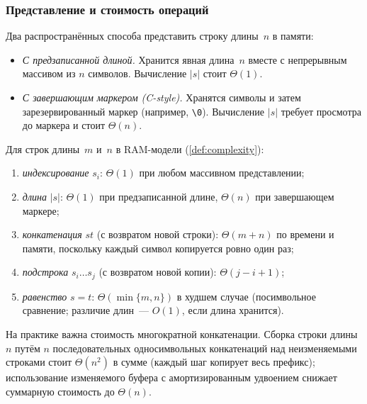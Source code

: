 \subsubsection*{Представление и стоимость операций}

Два распространённых способа представить строку длины~$n$ в памяти:
\begin{itemize}
  \item \emph{С предзаписанной длиной.} Хранится явная длина~$n$ вместе
        с непрерывным массивом из $n$ символов. Вычисление $|s|$
        стоит $\Theta(1)$.
  \item \emph{С завершающим маркером (C-style).} Хранятся символы и
        затем зарезервированный маркер (например,
        \texttt{\textbackslash 0}). Вычисление $|s|$ требует
        просмотра до маркера и стоит $\Theta(n)$.
\end{itemize}

\begin{proposition}
\label{prop:string-ops-cost}
Для строк длины~$m$ и~$n$ в RAM-модели (\cref{def:complexity}):
\begin{enumerate}[label=(\alph*)]
  \item \emph{индексирование} $s_i$: $\Theta(1)$ при любом массивном
        представлении;
  \item \emph{длина} $|s|$: $\Theta(1)$ при предзаписанной длине,
        $\Theta(n)$ при завершающем маркере;
  \item \emph{конкатенация} $s t$ (с возвратом новой строки):
        $\Theta(m + n)$ по времени и памяти, поскольку каждый символ
        копируется ровно один раз;
  \item \emph{подстрока} $s_i \dots s_j$ (с возвратом новой копии):
        $\Theta(j - i + 1)$;
  \item \emph{равенство} $s = t$: $\Theta(\min\{m, n\})$ в худшем
        случае (посимвольное сравнение; различие длин~--- $O(1)$, если
        длина хранится).
\end{enumerate}
\end{proposition}

\begin{remark}
На практике важна стоимость многократной конкатенации. Сборка строки
длины~$n$ путём $n$ последовательных односимвольных конкатенаций над
неизменяемыми строками стоит $\Theta(n^2)$ в сумме (каждый шаг копирует
весь префикс); использование изменяемого буфера с амортизированным
удвоением снижает суммарную стоимость до $\Theta(n)$.
\end{remark}

